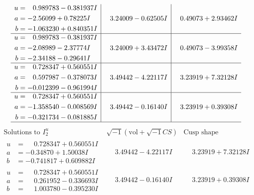 \documentclass[1p]{elsarticle_modified}
\theoremstyle{definition}
\newcommand{\I}{\sqrt{-1}}
\begin{document}
$$\begin{array}{c|c|c}
\begin{aligned}
u &= \phantom{-}0.989783 - 0.381937 I \\
a &= -2.56099 + 0.78225 I \\
b &= -1.063230 + 0.840351 I\end{aligned}
 & \phantom{-}3.24009 - 0.62505 I & \phantom{-}0.49073 + 2.93462 I \\ \hline\begin{aligned}
u &= \phantom{-}0.989783 - 0.381937 I \\
a &= -2.08989 - 2.37774 I \\
b &= -2.34188 - 0.29641 I\end{aligned}
 & \phantom{-}3.24009 + 3.43472 I & \phantom{-}0.49073 - 3.99358 I \\ \hline\begin{aligned}
u &= \phantom{-}0.728347 + 0.560551 I \\
a &= \phantom{-}0.597987 - 0.378073 I \\
b &= -0.012399 - 0.961994 I\end{aligned}
 & \phantom{-}3.49442 - 4.22117 I & \phantom{-}3.23919 + 7.32128 I \\ \hline\begin{aligned}
u &= \phantom{-}0.728347 + 0.560551 I \\
a &= -1.358540 - 0.008569 I \\
b &= -0.321734 - 0.081885 I\end{aligned}
 & \phantom{-}3.49442 - 0.16140 I & \phantom{-}3.23919 + 0.39308 I\\
 \hline 
 \end{array}$$\newpage$$\begin{array}{c|c|c}  
\text{Solutions to }I^u_{2}& \I (\text{vol} + \sqrt{-1}CS) & \text{Cusp shape}\\
 \hline 
\begin{aligned}
u &= \phantom{-}0.728347 + 0.560551 I \\
a &= -0.34870 + 1.50038 I \\
b &= -0.741817 + 0.609882 I\end{aligned}
 & \phantom{-}3.49442 - 4.22117 I & \phantom{-}3.23919 + 7.32128 I \\ \hline\begin{aligned}
u &= \phantom{-}0.728347 + 0.560551 I \\
a &= \phantom{-}0.261952 - 0.336693 I \\
b &= \phantom{-}1.003780 - 0.395230 I\end{aligned}
 & \phantom{-}3.49442 - 0.16140 I & \phantom{-}3.23919 + 0.39308 I \\ \hline\begin{aligned}

\end{aligned}
\end{array}$$
\end{document}
